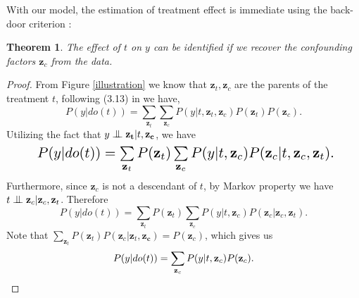 \documentclass[letterpaper]{article} %
\newcommand{\bigCI}{\mathrel{\text{\scalebox{1.07}{$\perp\mkern-10mu\perp$}}}}
\newtheorem{theorem}{Theorem}
\begin{document}
With our model, the estimation of treatment effect is immediate using the back-door criterion \cite{Pearl2009}:
\begin{theorem}
	The effect of $t$ on $y$ can be identified if we recover the confounding factors $\mathbf{z}_c$ from the data.
	\label{ATE}
\end{theorem}
\begin{proof}
	From Figure \ref{illustration} we know that $\mathbf{z}_t, \mathbf{z}_c$ are the parents of the treatment $t$, following (3.13) in \citeauthor{Pearl2009} we have,
	\begin{equation}
	P(y|do(t)) = \sum_{\mathbf{z}_t} \sum_{\mathbf{z}_c} P(y|t, \mathbf{z}_t,\mathbf{z}_c) P(\mathbf{z}_t)P(\mathbf{z}_c).
	\end{equation}
	Utilizing the fact that $y \bigCI \mathbf{z_t} |t, \mathbf{z_c}$, we have
	\begin{equation}
	\resizebox{0.89\hsize}{!}{
	$P(y|do(t)) = \sum\limits_{\mathbf{z}_t} P(\mathbf{z}_t) \sum\limits_{\mathbf{z}_c} P(y|t, \mathbf{z}_c) P(\mathbf{z}_c | t, \mathbf{z}_c, \mathbf{z}_t).$}
	\end{equation}
	Furthermore, since $\mathbf{z}_c$ is not a descendant of $t$, by Markov property we have $t \bigCI \mathbf{z}_c | \mathbf{z}_c,\mathbf{z}_t$. Therefore
	\begin{equation}
	P(y|do(t)) = \sum\limits_{\mathbf{z}_t} P(\mathbf{z}_t) \sum\limits_{\mathbf{z}_c} P(y|t, \mathbf{z}_c) P(\mathbf{z}_c | \mathbf{z}_c, \mathbf{z}_t).
	\end{equation}
	Note that $\sum\limits_{\mathbf{z}_t} P(\mathbf{z}_t) P(\mathbf{z}_c|\mathbf{z}_t,\mathbf{z_c}) = P(\mathbf{z}_c)$, which gives us
	\begin{equation*}
	P(y|do(t)) =\sum\limits_{\mathbf{z}_c} P(y|t,\mathbf{z}_c) P(\mathbf{z}_c).  \qedhere
	\end{equation*}
\end{proof}
\end{document}
